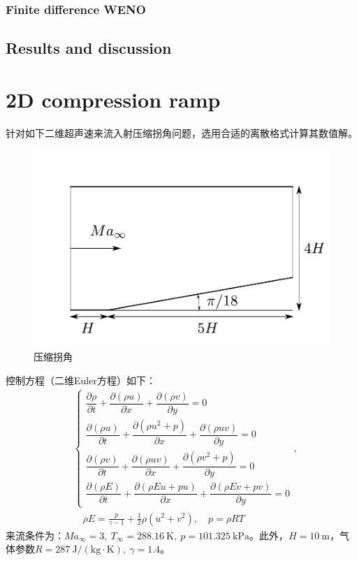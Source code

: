 \documentclass[11pt]{article}
\begin{document}
\subsubsection{Finite difference WENO}

\subsection{Results and discussion}

\newpage
\section{2D compression ramp}
针对如下二维超声速来流入射压缩拐角问题，选用合适的离散格式计算其数值解。
\begin{figure}[htbp]
	\centering
	\includegraphics[width=.5\linewidth]{figure/sketch/ramp.pdf}
	\caption{\label{fig:ramp}压缩拐角}
\end{figure}

控制方程（二维Euler方程）如下：
\begin{align}
	 & \left\{\begin{array}{l}
		\dfrac{\partial\rho}{\partial t}+\dfrac{\partial(\rho u)}{\partial x}+\dfrac{\partial(\rho v)}{\partial y}=0           \\[8pt]
		\dfrac{\partial(\rho u)}{\partial t}+\dfrac{\partial(\rho u^2+p)}{\partial x}+\dfrac{\partial(\rho u v)}{\partial y}=0 \\[8pt]
		\dfrac{\partial(\rho v)}{\partial t}+\dfrac{\partial(\rho uv)}{\partial x}+\dfrac{\partial(\rho v^2+p)}{\partial y}=0  \\[8pt]
		\dfrac{\partial(\rho E)}{\partial t}+\dfrac{\partial(\rho Eu+pu)}{\partial x}+\dfrac{\partial(\rho Ev+pv)}{\partial y}=0
	\end{array}\right., \label{eqn:euler2}              \\
	 & \quad \rho E=\frac{p}{\gamma-1}+\frac{1}{2}\rho(u^2+v^2),\quad p=\rho R T
\end{align}
来流条件为：$Ma_\infty=3,\ T_\infty=288.16\ \mathrm{K},\ p=101.325\ \mathrm{kPa}$。此外，$H=10\ \mathrm{m}$，气体参数$R=287\ \mathrm{J/(kg\cdot K)},\ \gamma=1.4$。
\end{document}
